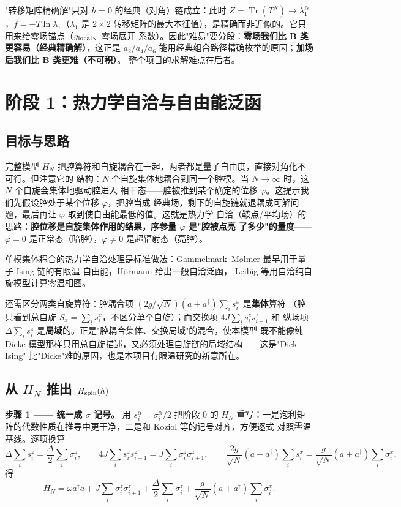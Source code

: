 \documentclass[UTF8,11pt,a4paper]{ctexart}
\begin{document}
"转移矩阵精确解"只对 $h=0$ 的经典（对角）链成立：此时
$Z=\operatorname{Tr}(T^N)\to\lambda_1^N$，$f=-T\ln\lambda_1$（$\lambda_1$ 是 $2\times2$
转移矩阵的最大本征值），是精确而非近似的。它只用来给零场锚点（$g_{\rm local}$、零场展开
系数）。因此"难易"要分段：\textbf{零场我们比 B 类更容易（经典精确解）}，这正是
$a_2/a_4/a_6$ 能用经典组合路径精确枚举的原因；\textbf{加场后我们比 B 类更难（不可积）}。
整个项目的求解难点在后者。

\section{阶段 1：热力学自洽与自由能泛函}

\subsection{目标与思路}

完整模型 $H_N$ 把腔算符和自旋耦合在一起，两者都是量子自由度，直接对角化不可行。但注意它的
结构：$N$ 个自旋集体地耦合到同一个腔模。当 $N\to\infty$ 时，这 $N$ 个自旋会集体地驱动腔进入
相干态——腔被推到某个确定的位移 $\varphi$。这提示我们先假设腔处于某个位移 $\varphi$，把腔当成
经典场，剩下的自旋链就退耦成可解问题，最后再让 $\varphi$ 取到使自由能最低的值。这就是热力学
自洽（鞍点/平均场）的思路：\textbf{腔位移是自旋集体作用的结果，序参量 $\varphi$ 是"腔被点亮
了多少"的量度}——$\varphi=0$ 是正常态（暗腔），$\varphi\neq0$ 是超辐射态（亮腔）。

单模集体耦合的热力学自洽处理是标准做法：Gammelmark–Mølmer 最早用于量子 Ising 链的有限温
自由能\cite{Gammelmark2011Thermal}，Hörmann 给出一般自洽泛函\cite{Hormann2026Folds}，
Leibig 等用自洽纯自旋模型计算零温相图\cite{Leibig2026SelfConsistent}。

还需区分两类自旋算符：腔耦合项 $(2g/\sqrt N)(a+a^\dagger)\sum_i s_i^x$ 是\textbf{集体}算符
（腔只看到总自旋 $S_x=\sum_i s_i^x$，不区分单个自旋）；而交换项 $4J\sum_i s_i^zs_{i+1}^z$ 和
纵场项 $\Delta\sum_i s_i^z$ 是\textbf{局域}的。正是"腔耦合集体、交换局域"的混合，使本模型
既不能像纯 Dicke 模型那样只用总自旋描述，又必须处理自旋链的局域结构——这是"Dick--Ising"
比"Dicke"难的原因，也是本项目有限温研究的新意所在。

\subsection{从 $H_N$ 推出 $H_{\rm spin}(h)$}

\textbf{步骤 1 —— 统一成 $\sigma$ 记号。} 用 $s_i^\alpha=\sigma_i^\alpha/2$ 把阶段 0 的
$H_N$ 重写：一是泡利矩阵的代数性质在推导中更干净，二是和 Koziol 等的记号对齐，方便逐式
对照零温基线\cite{Koziol2026Criticality}。逐项换算
\[
\Delta\sum_i s_i^z=\frac{\Delta}{2}\sum_i\sigma_i^z,\qquad
4J\sum_i s_i^z s_{i+1}^z=J\sum_i\sigma_i^z\sigma_{i+1}^z,\qquad
\frac{2g}{\sqrt N}(a+a^\dagger)\sum_i s_i^x=\frac{g}{\sqrt N}(a+a^\dagger)\sum_i\sigma_i^x,
\]
得
\begin{equation}
H_N=\omega a^\dagger a+J\sum_i\sigma_i^z\sigma_{i+1}^z+\frac{\Delta}{2}\sum_i\sigma_i^z
+\frac{g}{\sqrt N}(a+a^\dagger)\sum_i\sigma_i^x .
\label{eq:HN-sigma}
\end{equation}
\end{document}
